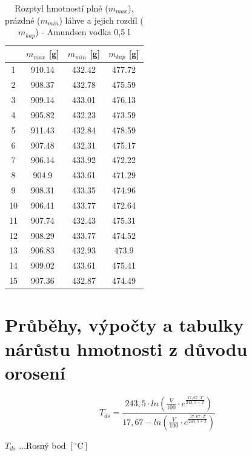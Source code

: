 \begin{table}[h]
    \centering
    \begin{tabular}{|c|c|c|c|}
        \hline
         & \textbf{$m_{max}$ [g]} & \textbf{$m_{min}$ [g]} & \textbf{$m_{kap}$ [g]} \\ \hline \hline
        1 & 910.14 & 432.42 & 477.72 \\ \hline
        2 & 908.37 & 432.78 & 475.59 \\ \hline
        3 & 909.14 & 433.01 & 476.13 \\ \hline
        4 & 905.82 & 432.23 & 473.59 \\ \hline
        5 & 911.43 & 432.84 & 478.59 \\ \hline
        6 & 907.48 & 432.31 & 475.17 \\ \hline
        7 & 906.14 & 433.92 & 472.22 \\ \hline
        8 & 904.9 & 433.61 & 471.29 \\ \hline
        9 & 908.31 & 433.35 & 474.96 \\ \hline
        10 & 906.41 & 433.77 & 472.64 \\ \hline
        11 & 907.74 & 432.43 & 475.31 \\ \hline
        12 & 908.29 & 433.77 & 474.52 \\ \hline
        13 & 906.83 & 432.93 & 473.9 \\ \hline
        14 & 909.02 & 433.61 & 475.41 \\ \hline
        15 & 907.36 & 432.87 & 474.49 \\ \hline
    \end{tabular}
    \caption{Rozptyl hmotností plné ($m_{max}$), prázdné ($m_{min}$) láhve a jejich rozdíl ($m_{kap}$) - Amundsen vodka 0,5 l}
    \label{tab:chyba_lahve_a_plnění}
\end{table}


\section{Průběhy, výpočty a tabulky nárůstu hmotnosti z důvodu orosení}

\begin{equation}
T_{ds} = \frac{243,5 \cdot ln(\frac{V}{100} \cdot e^{\frac{17,67 \cdot T}{243,5 + T}})}{17,67 - ln(\frac{V}{100} \cdot e^{\frac{17,67 \cdot T}{243,5 + T}})}
\label{rosný bod obecne}
\end{equation}

\(T_{ds}\) ...Rosný bod \([\mathrm{^\circ C}]\)

